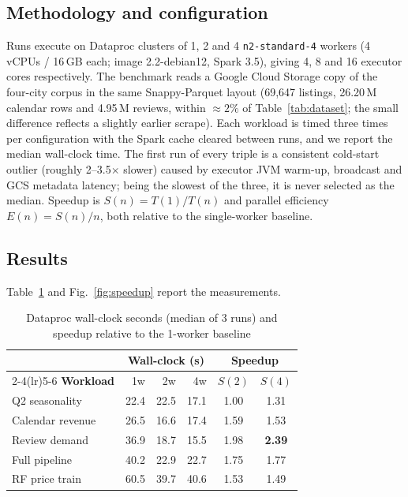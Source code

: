 \documentclass[conference]{IEEEtran}
\begin{document}
\subsection{Methodology and configuration}
Runs execute on Dataproc clusters of 1, 2 and 4 \texttt{n2-standard-4} workers (4 vCPUs / 16\,GB each; image 2.2-debian12, Spark 3.5), giving 4, 8 and 16 executor cores respectively. The benchmark reads a Google Cloud Storage copy of the four-city corpus in the same Snappy-Parquet layout (69{,}647 listings, 26.20\,M calendar rows and 4.95\,M reviews, within $\approx 2\%$ of Table~\ref{tab:dataset}; the small difference reflects a slightly earlier scrape). Each workload is timed three times per configuration with the Spark cache cleared between runs, and we report the median wall-clock time. The first run of every triple is a consistent cold-start outlier (roughly 2--3.5$\times$ slower) caused by executor JVM warm-up, broadcast and GCS metadata latency; being the slowest of the three, it is never selected as the median. Speedup is $S(n)=T(1)/T(n)$ and parallel efficiency $E(n)=S(n)/n$, both relative to the single-worker baseline.

\subsection{Results}
Table~\ref{tab:bench} and Fig.~\ref{fig:speedup} report the measurements.

\begin{table}[H]
\caption{Dataproc wall-clock seconds (median of 3 runs) and speedup relative to the 1-worker baseline}
\label{tab:bench}
\centering
\begin{tabular}{lrrrcc}
\toprule
 & \multicolumn{3}{c}{\textbf{Wall-clock (s)}} & \multicolumn{2}{c}{\textbf{Speedup}} \\
\cmidrule(lr){2-4}\cmidrule(lr){5-6}
\textbf{Workload} & 1w & 2w & 4w & $S(2)$ & $S(4)$ \\
\midrule
Q2 seasonality   & 22.4 & 22.5 & 17.1 & 1.00 & 1.31 \\
Calendar revenue & 26.5 & 16.6 & 17.4 & 1.59 & 1.53 \\
Review demand    & 36.9 & 18.7 & 15.5 & 1.98 & \textbf{2.39} \\
Full pipeline    & 40.2 & 22.9 & 22.7 & 1.75 & 1.77 \\
RF price train   & 60.5 & 39.7 & 40.6 & 1.53 & 1.49 \\
\bottomrule
\end{tabular}
\end{table}
\end{document}
